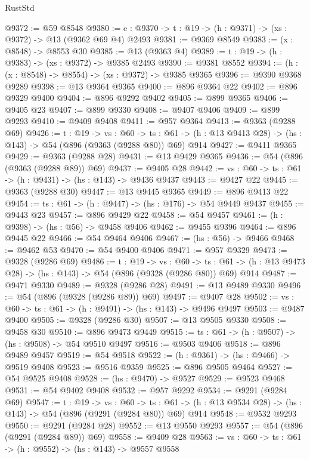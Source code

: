 \begin{lexlean}{RustStd}
\begin{coremodule}
@9372 := @59 @8548
@9380 := {e : @9370} -> {t : @19} -> (h : @9371) -> (xs : @9372) -> @13 (@9362 @69 @4) @2493
@9381 := @9369 @8549
@9383 := (x : @8548) -> @8553 @30
@9385 := @13 (@9363 @4)
@9389 := {t : @19} -> (h : @9383) -> (xs : @9372) -> @9385 @2493
@9390 := @9381 @8552
@9394 := (h : (x : @8548) -> @8554) -> (xs : @9372) -> @9385 @9365
@9396 := @9390 @9368 @9289
@9398 := @13 @9364 @9365
@9400 := @896 @9364 @22
@9402 := @896 @9329 @9400
@9404 := @896 @9292 @9402
@9405 := @899 @9365
@9406 := @9405 @23
@9407 := @899 @9330
@9408 := @9407 @9406
@9409 := @899 @9293
@9410 := @9409 @9408
@9411 := @957 @9364
@9413 := @9363 (@9288 @69)
@9426 := {t : @19} ->
  {vs : @60} ->
  {ts : @61} -> (h : @13 @9413 @28) -> (hs : @143) -> @54 (@896 (@9363 (@9288 @80)) @69) @914
@9427 := @9411 @9365
@9429 := @9363 (@9288 @28)
@9431 := @13 @9429 @9365
@9436 := @54 (@896 (@9363 (@9288 @89)) @69)
@9437 := @9405 @28
@9442 := {vs : @60} -> {ts : @61} -> (h : @9431) -> (hs : @143) -> @9436 @9437
@9443 := @9427 @22
@9445 := @9363 (@9288 @30)
@9447 := @13 @9445 @9365
@9449 := @896 @9413 @22
@9454 := {ts : @61} -> (h : @9447) -> (hs : @176) -> @54 @9449 @9437
@9455 := @9443 @23
@9457 := @896 @9429 @22
@9458 := @54 @9457
@9461 := (h : @9398) -> (hs : @56) -> @9458 @9406
@9462 := @9455 @9396
@9464 := @896 @9445 @22
@9466 := @54 @9464 @9406
@9467 := (hs : @56) -> @9466
@9468 := @9462 @53
@9470 := @54 @9400 @9406
@9471 := @957 @9329
@9473 := @9328 (@9286 @69)
@9486 := {t : @19} ->
  {vs : @60} ->
  {ts : @61} -> (h : @13 @9473 @28) -> (hs : @143) -> @54 (@896 (@9328 (@9286 @80)) @69) @914
@9487 := @9471 @9330
@9489 := @9328 (@9286 @28)
@9491 := @13 @9489 @9330
@9496 := @54 (@896 (@9328 (@9286 @89)) @69)
@9497 := @9407 @28
@9502 := {vs : @60} -> {ts : @61} -> (h : @9491) -> (hs : @143) -> @9496 @9497
@9503 := @9487 @9400
@9505 := @9328 (@9286 @30)
@9507 := @13 @9505 @9330
@9508 := @9458 @30
@9510 := @896 @9473 @9449
@9515 := {ts : @61} -> (h : @9507) -> (hs : @9508) -> @54 @9510 @9497
@9516 := @9503 @9406
@9518 := @896 @9489 @9457
@9519 := @54 @9518
@9522 := (h : @9361) -> (hs : @9466) -> @9519 @9408
@9523 := @9516 @9359
@9525 := @896 @9505 @9464
@9527 := @54 @9525 @9408
@9528 := (hs : @9470) -> @9527
@9529 := @9523 @9468
@9531 := @54 @9402 @9408
@9532 := @957 @9292
@9534 := @9291 (@9284 @69)
@9547 := {t : @19} ->
  {vs : @60} ->
  {ts : @61} -> (h : @13 @9534 @28) -> (hs : @143) -> @54 (@896 (@9291 (@9284 @80)) @69) @914
@9548 := @9532 @9293
@9550 := @9291 (@9284 @28)
@9552 := @13 @9550 @9293
@9557 := @54 (@896 (@9291 (@9284 @89)) @69)
@9558 := @9409 @28
@9563 := {vs : @60} -> {ts : @61} -> (h : @9552) -> (hs : @143) -> @9557 @9558

\end{coremodule}
\end{lexlean}
